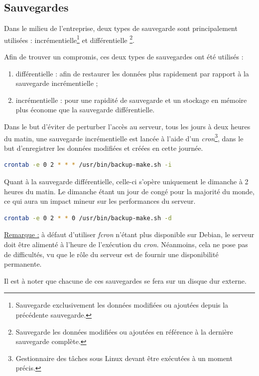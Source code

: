 \subsection{Sauvegardes}
\label{subsec:sauvegardes}

Dans le milieu de l'entreprise, deux types de sauvegarde sont principalement
utilisées : incrémentielle\footnote{Sauvegarde exclusivement les données
modifiées ou ajoutées depuis la précédente sauvegarde.} et différentielle
\footnote{Sauvegarde les données modifiées ou ajoutées en référence à la
dernière sauvegarde complète.}.

Afin de trouver un compromis, ces deux types de sauvegardes ont été utilisés :

\begin{enumerate}
\item différentielle : afin de restaurer les données plus rapidement par rapport
  à la sauvegarde incrémentielle ;

\item incrémentielle : pour une rapidité de sauvegarde et un stockage en mémoire
plus économe que la sauvegarde différentielle.
\end{enumerate}

Dans le but d'éviter de perturber l'accès au serveur, tous les jours à deux heures du matin, une
sauvegarde incrémentielle est lancée à l'aide d'un
\emph{cron}\footnote{Gestionnaire des tâches sous Linux devant être exécutées à
un moment précis.}, dans le but d'enregistrer les données modifiées et créées en
cette journée.

\begin{lstlisting}[language=bash]
crontab -e 0 2 * * * /usr/bin/backup-make.sh -i
\end{lstlisting}

Quant à la sauvegarde différentielle, celle-ci s'opère uniquement le dimanche à
2 heures du matin. Le dimanche étant un jour de congé pour la majorité du monde,
ce qui aura un impact mineur sur les performances du serveur.

\begin{lstlisting}[language=bash]
crontab -e 0 2 * * 0 /usr/bin/backup-make.sh -d
\end{lstlisting}

\underline{Remarque :} à défaut d'utiliser \textit{fcron} n'étant plus
disponible sur Debian, le serveur doit être alimenté à l'heure de l'exécution du
\textit{cron}. Néanmoins, cela ne pose pas de difficultés, vu que le rôle du
serveur est de fournir une disponibilité permanente.

Il est à noter que chacune de ces sauvegardes se fera sur un disque dur externe.

